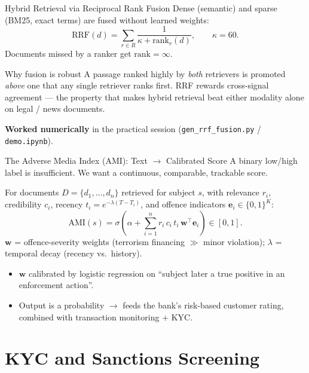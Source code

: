 \documentclass[9pt,t]{beamer}
\begin{document}
\begin{frame}{Hybrid Retrieval via Reciprocal Rank Fusion}
Dense (semantic) and sparse (BM25, exact terms) are fused without learned weights:
\[
\mathrm{RRF}(d) = \sum_{r \in R} \frac{1}{\kappa + \mathrm{rank}_r(d)},
\qquad \kappa = 60.
\]
Documents missed by a ranker get $\mathrm{rank} = \infty$.

\medskip
\begin{exampleblock}{Why fusion is robust}
A passage ranked highly by \emph{both} retrievers is promoted \emph{above} one
that any single retriever ranks first. RRF rewards cross-signal agreement ---
the property that makes hybrid retrieval beat either modality alone on legal /
news documents.
\end{exampleblock}

\medskip
\footnotesize \textbf{Worked numerically} in the practical session
(\texttt{gen\_rrf\_fusion.py} / \texttt{demo.ipynb}).
\end{frame}

\begin{frame}{The Adverse Media Index (AMI): Text $\to$ Calibrated Score}
A binary low/high label is insufficient. We want a continuous, comparable,
trackable score.

\medskip
\begin{underhood}
For documents $D=\{d_1,\dots,d_n\}$ retrieved for subject $s$, with relevance
$r_i$, credibility $c_i$, recency $t_i = e^{-\lambda(T-T_i)}$, and offence
indicators $\mathbf{e}_i \in \{0,1\}^K$:
\[
\mathrm{AMI}(s) = \sigma\!\left(\alpha + \sum_{i=1}^{n} r_i\, c_i\, t_i\,
\mathbf{w}^{\top}\mathbf{e}_i\right) \in [0,1].
\]
$\mathbf{w}$ = offence-severity weights (terrorism financing $\gg$ minor
violation); $\lambda$ = temporal decay (recency vs.\ history).
\end{underhood}

\medskip
\begin{itemize}
  \item $\mathbf{w}$ calibrated by logistic regression on ``subject later a true
        positive in an enforcement action''.
  \item Output is a probability $\to$ feeds the bank's risk-based customer rating,
        combined with transaction monitoring + KYC.
\end{itemize}
\end{frame}

\section{KYC and Sanctions Screening}
\end{document}
